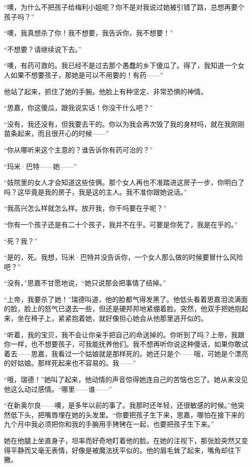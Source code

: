 \par “噢，为什么不把孩子给梅利小姐呢？你不是对我说过她被引错了路，总想再要个孩子吗？”
\par “噢，我真想杀了你！我不想要，我告诉你，我不想要！”
\par “不想要？请继续说下去。”
\par “噢，有药可救的。我已经不是过去那个愚蠢的乡下傻瓜了。得了，我知道一个女人如果不想要孩子，那她是可以不用要的！有药——”
\par 他站了起来，抓住了她的手腕。他脸上有种坚定、非常恐惧的神情。
\par “思嘉，你这傻瓜，跟我说实话！你没干什么吧？”
\par “没有，我还没有，但我要去干的。你以为我会再次毁了我的身材吗，就在我刚刚苗条起来，而且很开心的时候——”
\par “你从哪听来这个主意的？谁告诉你有药可治的？”
\par “玛米·巴特——她——”
\par “妓院里的女人才会知道这些伎俩。那个女人再也不准踏进这房子一步，你明白了吗？这毕竟是我的房子，我是这的主人。我不准你跟她说话。”
\par “我高兴怎么样就怎么样。放开我，你干吗要在乎呢？”
\par “你有一个孩子还是有二十个孩子，我并不在乎。可要是你死了，我是在乎的。”
\par “死？我？”
\par “是的，死。我想，玛米·巴特并没告诉你，一个女人那么做的时候要冒什么风险吧？”
\par “没有，”思嘉不甘愿地说，“她只说那会把事情了结掉。”
\par “上帝，我要杀了她！”瑞德叫道，他的脸都气得发黑了。他低头看着思嘉泪流满面的脸，脸上的怒气已退去一些，但还是硬邦邦地紧绷着脸。突然，他双手把她抱起来，坐在椅子上，紧紧抱着她，就好像担心她会从他那里逃开似的。
\par “听着，我的宝贝，我不会让你亲手把自己的命送掉的。你听到了吗？上帝，我跟你一样，也不想要孩子，可我能抚养他们。我不想再听你说这种傻话，如果你敢试着去——思嘉，我看过一个姑娘就是那样死的。她还只是个——哦，可她是个漂亮的好姑娘。那样死起来也不容易的。我——”
\par “哦，瑞德！”她叫了起来，他动情的声音惊得她连自己的苦恼也忘了。她从来没见他这么动过感情。“哪里——谁——”
\par “在新奥尔良——噢，是多年以前的事了。我那时还年轻，还很敏感的时候。”他突然低下头，把嘴唇埋在她的头发里。“你要把孩子生下来，思嘉，哪怕在接下来的九个月中我必须把你和我的手腕用手铐铐在一起，也要把孩子生下来。”
\par 她在他腿上坐直身子，坦率而好奇地盯着他的脸。在她的注视下，那张脸突然又变得平静而又毫无表情，好像是被魔法抚平似的。他的眉毛耸了起来，嘴角却往下撇。
